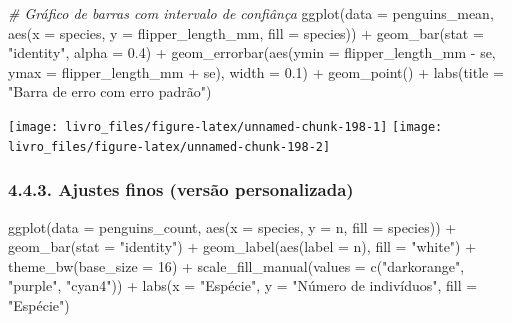 \documentclass[
]{book}
\newenvironment{Shaded}{\begin{snugshade}}{\end{snugshade}}
\newcommand{\AttributeTok}[1]{\textcolor[rgb]{0.61,0.61,0.61}{#1}}
\newcommand{\CommentTok}[1]{\textcolor[rgb]{0.37,0.37,0.37}{\textit{#1}}}
\newcommand{\DecValTok}[1]{\textcolor[rgb]{0.06,0.06,0.06}{#1}}
\newcommand{\FloatTok}[1]{\textcolor[rgb]{0.06,0.06,0.06}{#1}}
\newcommand{\FunctionTok}[1]{\textcolor[rgb]{0,0,0}{#1}}
\newcommand{\NormalTok}[1]{#1}
\newcommand{\SpecialCharTok}[1]{\textcolor[rgb]{0,0,0}{#1}}
\newcommand{\StringTok}[1]{\textcolor[rgb]{0.5,0.5,0.5}{#1}}
\begin{document}
\begin{Shaded}
\begin{Highlighting}[]
\CommentTok{\# Gráfico de barras com intervalo de confiânça}
\FunctionTok{ggplot}\NormalTok{(}\AttributeTok{data =}\NormalTok{ penguins\_mean, }
       \FunctionTok{aes}\NormalTok{(}\AttributeTok{x =}\NormalTok{ species, }
           \AttributeTok{y =}\NormalTok{ flipper\_length\_mm, }
           \AttributeTok{fill =}\NormalTok{ species)) }\SpecialCharTok{+}
  \FunctionTok{geom\_bar}\NormalTok{(}\AttributeTok{stat =} \StringTok{"identity"}\NormalTok{, }\AttributeTok{alpha =} \FloatTok{0.4}\NormalTok{) }\SpecialCharTok{+}
  \FunctionTok{geom\_errorbar}\NormalTok{(}\FunctionTok{aes}\NormalTok{(}\AttributeTok{ymin =}\NormalTok{ flipper\_length\_mm }\SpecialCharTok{{-}}\NormalTok{ se,}
                    \AttributeTok{ymax =}\NormalTok{ flipper\_length\_mm }\SpecialCharTok{+}\NormalTok{ se),}
                \AttributeTok{width =} \FloatTok{0.1}\NormalTok{) }\SpecialCharTok{+} 
  \FunctionTok{geom\_point}\NormalTok{() }\SpecialCharTok{+}
  \FunctionTok{labs}\NormalTok{(}\AttributeTok{title =} \StringTok{"Barra de erro com erro padrão"}\NormalTok{)}
\end{Highlighting}
\end{Shaded}

\begin{center}\texttt{[image: livro\_files/figure-latex/unnamed-chunk-198-1]} \texttt{[image: livro\_files/figure-latex/unnamed-chunk-198-2]} \end{center}

\hypertarget{ajustes-finos-versuxe3o-personalizada-3}{%
\subsubsection{4.4.3. Ajustes finos (versão personalizada)}\label{ajustes-finos-versuxe3o-personalizada-3}}

\begin{Shaded}
\begin{Highlighting}[]

\FunctionTok{ggplot}\NormalTok{(}\AttributeTok{data =}\NormalTok{ penguins\_count, }
       \FunctionTok{aes}\NormalTok{(}\AttributeTok{x =}\NormalTok{ species, }\AttributeTok{y =}\NormalTok{ n, }\AttributeTok{fill =}\NormalTok{ species)) }\SpecialCharTok{+}
  \FunctionTok{geom\_bar}\NormalTok{(}\AttributeTok{stat =} \StringTok{"identity"}\NormalTok{) }\SpecialCharTok{+}
  \FunctionTok{geom\_label}\NormalTok{(}\FunctionTok{aes}\NormalTok{(}\AttributeTok{label =}\NormalTok{ n), }
             \AttributeTok{fill =} \StringTok{"white"}\NormalTok{) }\SpecialCharTok{+}
  \FunctionTok{theme\_bw}\NormalTok{(}\AttributeTok{base\_size =} \DecValTok{16}\NormalTok{) }\SpecialCharTok{+}
  \FunctionTok{scale\_fill\_manual}\NormalTok{(}\AttributeTok{values =} \FunctionTok{c}\NormalTok{(}\StringTok{"darkorange"}\NormalTok{, }\StringTok{"purple"}\NormalTok{, }\StringTok{"cyan4"}\NormalTok{)) }\SpecialCharTok{+}
  \FunctionTok{labs}\NormalTok{(}\AttributeTok{x =} \StringTok{"Espécie"}\NormalTok{, }\AttributeTok{y =} \StringTok{"Número de indivíduos"}\NormalTok{, }\AttributeTok{fill =} \StringTok{"Espécie"}\NormalTok{)}
\end{Highlighting}
\end{Shaded}
\end{document}
